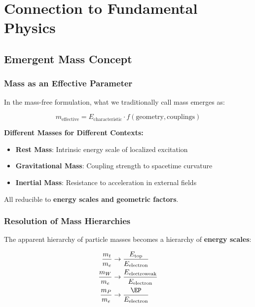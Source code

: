 	\section{Connection to Fundamental Physics}
	\label{sec:fundamental_connection}
	
	\subsection{Emergent Mass Concept}
	\label{subsec:emergent_mass}
	
	\subsubsection{Mass as an Effective Parameter}
	
	In the mass-free formulation, what we traditionally call mass emerges as:
	
	\begin{equation}
		m_{\text{effective}} = E_{\text{characteristic}} \cdot f(\text{geometry}, \text{couplings})
		\label{eq:emergent_mass}
	\end{equation}
	
	\textbf{Different Masses for Different Contexts:}
	\begin{itemize}
		\item \textbf{Rest Mass}: Intrinsic energy scale of localized excitation
		\item \textbf{Gravitational Mass}: Coupling strength to spacetime curvature  
		\item \textbf{Inertial Mass}: Resistance to acceleration in external fields
	\end{itemize}
	
	All reducible to \textbf{energy scales and geometric factors}.
	
	\subsubsection{Resolution of Mass Hierarchies}
	
	The apparent hierarchy of particle masses becomes a hierarchy of \textbf{energy scales}:
	
	\begin{align}
		\frac{m_t}{m_e} &\rightarrow \frac{E_{\text{top}}}{E_{\text{electron}}} \\
		\frac{m_W}{m_e} &\rightarrow \frac{E_{\text{electroweak}}}{E_{\text{electron}}} \\
		\frac{m_P}{m_e} &\rightarrow \frac{\EP}{E_{\text{electron}}}
	\end{align}
	
